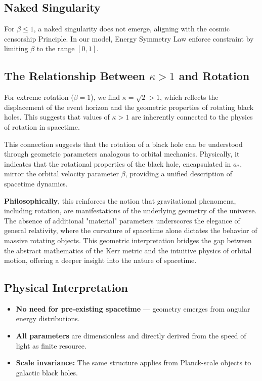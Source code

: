 \documentclass[12pt, a4paper]{article}
\begin{document}
\subsection{Naked Singularity}
For \(\beta \leq 1\), a naked singularity does not emerge, aligning with the cosmic censorship Principle. In our model, Energy Symmetry Law enforce constraint by limiting \(\beta\) to the range \([0, 1]\).

\subsection{The Relationship Between \(\kappa > 1\) and Rotation}
For extreme rotation (\(\beta = 1\)), we find \(\kappa = \sqrt{2} > 1\), which reflects the displacement of the event horizon and the geometric properties of rotating black holes. This suggests that values of \(\kappa > 1\) are inherently connected to the physics of rotation in spacetime.

This connection suggests that the rotation of a black hole can be understood through geometric parameters analogous to orbital mechanics. Physically, it indicates that the rotational properties of the black hole, encapsulated in \(a_*\), mirror the orbital velocity parameter \(\beta\), providing a unified description of spacetime dynamics.

\textbf{Philosophically}, this reinforces the notion that gravitational phenomena, including rotation, are manifestations of the underlying geometry of the universe. The absence of additional "material" parameters underscores the elegance of general relativity, where the curvature of spacetime alone dictates the behavior of massive rotating objects. This geometric interpretation bridges the gap between the abstract mathematics of the Kerr metric and the intuitive physics of orbital motion, offering a deeper insight into the nature of spacetime.

\subsection*{Physical Interpretation}

\begin{itemize}
  \item \textbf{No need for pre-existing spacetime} — geometry emerges from angular energy distributions.
  \item \textbf{All parameters} are dimensionless and directly derived from the speed of light as finite resource.
  \item \textbf{Scale invariance:} The same structure applies from Planck-scale objects to galactic black holes.
\end{itemize}
\end{document}
